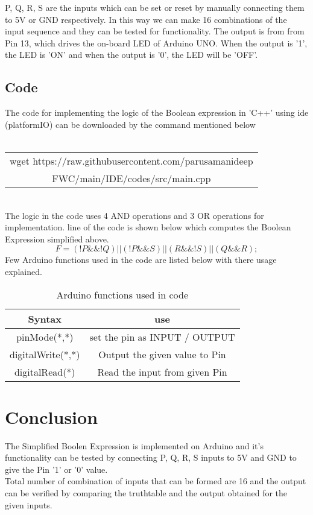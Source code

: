 \documentclass[journal,12pt,twocolumn]{IEEEtran}
\begin{document}
P, Q, R, S are the inputs which can be set or reset by manually connecting them to 5V or GND respectively. In this way we can make 16 combinations of the input sequence and they can be tested for functionality.
The output is from from Pin 13, which drives the on-board LED of Arduino UNO. When the output is '1', the LED is 'ON' and when the output is '0', the LED will be 'OFF'.\\
 
\subsection{Code}
The code for implementing the logic of the Boolean expression in 'C++' using ide (platformIO) can be downloaded by the command mentioned below \\ \\
\begin{tabular}{|c|}
    \hline
wget https://raw.githubusercontent.com/parusamanideep
\\FWC/main/IDE/codes/src/main.cpp\\
     \hline
\end{tabular}\\

\bigskip
The logic in the code uses 4 AND operations and 3 OR operations for implementation. line of the code is shown below which computes the Boolean Expression simplified above.
$$ F = (!P\&\&!Q) || (!P\&\&S) || (R\&\&!S) || (Q\&\&R); $$
Few Arduino functions used in the code are listed below with there usage explained.\\

\begin{table}[h]
\centering
\begin{tabular}{|c|c|}
\hline
Syntax & use\\
\hline
pinMode(*,*)& set the pin as INPUT / OUTPUT\\
\hline
digitalWrite(*,*)& Output the given value to Pin\\
\hline
digitalRead(*)& Read the input from given Pin\\
\hline 
\end{tabular}
\bigskip
\caption{Arduino functions used in code} 
\end{table}  

\section{Conclusion}
The Simplified Boolen Expression is implemented on Arduino and it's functionality can be tested by connecting P, Q, R, S inputs to 5V and GND to give the Pin '1' or '0' value.\\
Total number of combination of inputs that can be formed are 16 and the output can be verified by comparing the truthtable and the output obtained for the given inputs.
\end{document}
